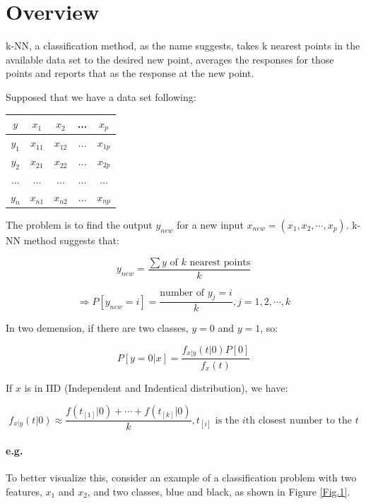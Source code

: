 \documentclass{article}
\begin{document}
\clearpage 

\section{Overview}{
    k-NN, a classification method, as the name suggests, takes k nearest points in the available data set to the desired new point, averages the responses for those points and reports that as the response at the new point. 

    Supposed that we have a data set following:

    \begin{center}{
        \begin{tabular}{c|c c c c }

            $y$ & $x_1$ & $x_2$ & ... & $x_p$ \\
            \hline
            $y_1$ & $x_{11}$ & $x_{12}$ & ... & $x_{1p}$ \\
            
            $y_2$ & $x_{21}$ & $x_{22}$ & ... & $x_{2p}$ \\
            
            ... & ... & ... & ... & ... \\
            
            $y_n$ & $x_{n1}$ & $x_{n2}$ & ... & $x_{np}$ \\
            
        \end{tabular}
    }
    \end{center}

    The problem is to find the output $y_{new}$ for a new input \(x_{new}=(x_1,x_2, \cdots,x_p)\). k-NN method suggests that:

    \[y_{new}=\frac{\sum y \text{ of } k \text{ nearest points}}{k}\]

    \[\Rightarrow P[y_{new}=i]=\frac{\text{number of } y_j=i}{k}, j=1,2,\cdots,k\]

    In two demension, if there are two classes, \(y=0\) and \(y=1\), so:

    \[P[y=0|x]=\frac{f_{x|y}(t|0)P[0]}{f_x(t)}\]

    If $x$ is in IID (Independent and Indentical distribution), we have:

    \[f_{x|y}(t|0)\approx \frac{f(t_{[1]}|0)+\cdots+f(t_{[k]}|0)}{k}, t_{[i]} \text{ is the $i$th closest number to the $t$}\]

    \paragraph{e.g. }{
        To better visualize this, consider an example of a classification problem with two features, $x_1$ and $x_2$, and two classes, blue and black, as shown in Figure \ref{Fig.1}. 

}}
\end{document}

